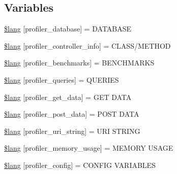 \subsection*{Variables}
\begin{DoxyCompactItemize}
\item 
\mbox{\hyperlink{profiler__lang_8php_a0e6ca63f05667222cdd21d238c40671b}{\$lang}} \mbox{[}\textquotesingle{}profiler\+\_\+database\textquotesingle{}\mbox{]} = \textquotesingle{}D\+A\+T\+A\+B\+A\+SE\textquotesingle{}
\item 
\mbox{\hyperlink{profiler__lang_8php_a570f8e02263bcc3d1baaac2e83bd9863}{\$lang}} \mbox{[}\textquotesingle{}profiler\+\_\+controller\+\_\+info\textquotesingle{}\mbox{]} = \textquotesingle{}C\+L\+A\+SS/M\+E\+T\+H\+OD\textquotesingle{}
\item 
\mbox{\hyperlink{profiler__lang_8php_a43df5e5b3666cfdcf0289ce6a9a78099}{\$lang}} \mbox{[}\textquotesingle{}profiler\+\_\+benchmarks\textquotesingle{}\mbox{]} = \textquotesingle{}B\+E\+N\+C\+H\+M\+A\+R\+KS\textquotesingle{}
\item 
\mbox{\hyperlink{profiler__lang_8php_a8ce1867179a75fc03294c0daf4fd1936}{\$lang}} \mbox{[}\textquotesingle{}profiler\+\_\+queries\textquotesingle{}\mbox{]} = \textquotesingle{}Q\+U\+E\+R\+I\+ES\textquotesingle{}
\item 
\mbox{\hyperlink{profiler__lang_8php_ae1ccbfaf8b047b3b3d70a0f8186c5cc6}{\$lang}} \mbox{[}\textquotesingle{}profiler\+\_\+get\+\_\+data\textquotesingle{}\mbox{]} = \textquotesingle{}G\+ET D\+A\+TA\textquotesingle{}
\item 
\mbox{\hyperlink{profiler__lang_8php_a9c5ac508141b22eb6364531c0a95b0a1}{\$lang}} \mbox{[}\textquotesingle{}profiler\+\_\+post\+\_\+data\textquotesingle{}\mbox{]} = \textquotesingle{}P\+O\+ST D\+A\+TA\textquotesingle{}
\item 
\mbox{\hyperlink{profiler__lang_8php_a319f7bcda8a7d5175ebc0d90e47bd1f0}{\$lang}} \mbox{[}\textquotesingle{}profiler\+\_\+uri\+\_\+string\textquotesingle{}\mbox{]} = \textquotesingle{}U\+RI S\+T\+R\+I\+NG\textquotesingle{}
\item 
\mbox{\hyperlink{profiler__lang_8php_afd17945cbf5c2c86dc685bd2e17b0f9b}{\$lang}} \mbox{[}\textquotesingle{}profiler\+\_\+memory\+\_\+usage\textquotesingle{}\mbox{]} = \textquotesingle{}M\+E\+M\+O\+RY U\+S\+A\+GE\textquotesingle{}
\item 
\mbox{\hyperlink{profiler__lang_8php_a72379fb9151c4d4d3bf61e8b15e6e643}{\$lang}} \mbox{[}\textquotesingle{}profiler\+\_\+config\textquotesingle{}\mbox{]} = \textquotesingle{}C\+O\+N\+F\+IG V\+A\+R\+I\+A\+B\+L\+ES\textquotesingle{}

\end{DoxyCompactItemize}
